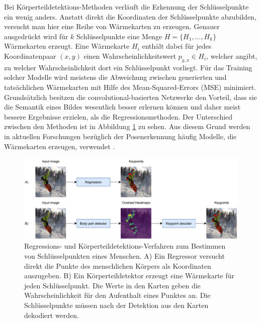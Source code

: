 Bei Körperteildetektions-Methoden verläuft die Erkennung der Schlüsselpunkte ein
wenig anders. Anstatt direkt die Koordinaten der Schlüsselpunkte abzubilden,
versucht man hier eine Reihe von Wärmekarten zu erzeugen. Genauer ausgedrückt
wird für $k$ Schlüsselpunkte eine Menge $H = \{H_1, ..., H_k\}$ Wärmekarten
erzeugt. Eine Wärmekarte $H_i$ enthält dabei für jedes Koordinatenpaar $(x, y)$
einen Wahrscheinlichkeitswert $p_{y, x} \in H_i$, welcher angibt, zu welcher
Wahrscheinlichkeit dort ein Schlüsselpunkt vorliegt. Für das Training solcher
Modelle wird meistens die Abweichung zwischen generierten und tatsächlichen
Wärmekarten mit Hilfe des Mean-Squared-Errors (MSE) minimiert. Grund\-sätz\-lich
besitzen die convolutional-basierten Netzwerke den Vorteil, dass sie die
Semantik eines Bildes wesentlich besser erlernen können und daher meist bessere
Ergebnisse erzielen, als die Regressionsmethoden. Der Unterschied zwischen den
Methoden ist in Abbildung \ref{fig:pose-detection} zu sehen. Aus diesem Grund
werden in aktuellen Forschungen bezüglich der Posenerkennung häufig Modelle, die
Wärmekarten erzeugen, verwendet \cite{zheng2021deep}.

\begin{figure}
    \includegraphics[width=\textwidth]{images/pose_detection.pdf}
    \caption{Regressions- und Körperteildetektions-Verfahren
    zum Bestimmen von Schlüsselpunkten eines Menschen. A) Ein Regressor
    versucht direkt die Punkte des menschlichen Körpers als Koordinaten
    auszugeben. B) Ein Körperteildetektor erzeugt eine Wärmekarte für jeden
    Schlüsselpunkt. Die Werte in den Karten geben die Wahrscheinlichkeit für den
    Aufenthalt eines Punktes an. Die Schlüsselpunkte müssen nach der Detektion aus den Karten dekodiert werden.}
    \label{fig:pose-detection}
\end{figure}

